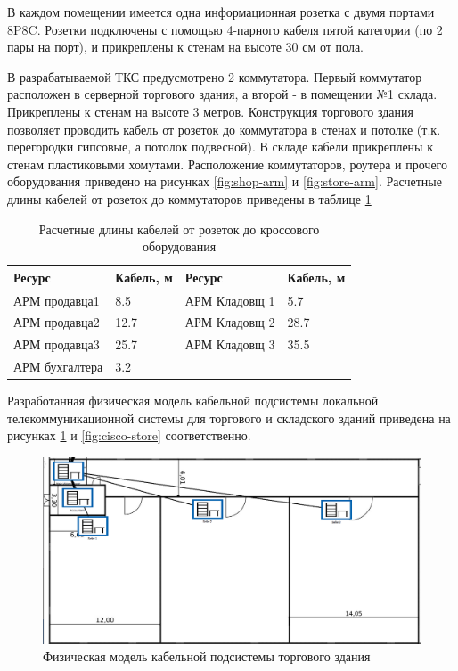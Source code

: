 В каждом помещении имеется одна информационная розетка с двумя портами 8P8C. Розетки подключены с помощью 4-парного кабеля пятой категории (по 2 пары на порт), и прикреплены к стенам на высоте 30 см от пола.

В разрабатываемой ТКС предусмотрено 2 коммутатора. Первый коммутатор расположен в серверной торгового здания, а второй \hyp{} в помещении №1 склада. Прикреплены к стенам на высоте 3 метров. Конструкция торгового здания позволяет проводить кабель от розеток до коммутатора в стенах и потолке (т.к. перегородки гипсовые, а потолок подвесной). В складе кабели прикреплены к стенам пластиковыми хомутами. Расположение коммутаторов, роутера и прочего оборудования приведено на рисунках \ref{fig:shop-arm} и \ref{fig:store-arm}. Расчетные длины кабелей от розеток до коммутаторов приведены в таблице \ref{tab:crosscablen}

\begin{table}[H]
  \centering
  \caption{Расчетные длины кабелей от розеток до кроссового оборудования}
  \begin{tabular}{|l|l||l|l|} \hline
    Ресурс & Кабель, м & Ресурс & Кабель, м \\ \hline
    АРМ продавца1 & 8.5 & АРМ Кладовщ 1 & 5.7\\ \hline
    АРМ продавца2 & 12.7 & АРМ Кладовщ 2 & 28.7\\ \hline
    АРМ продавца3 & 25.7 & АРМ Кладовщ 3 & 35.5\\ \hline
    АРМ бухгалтера & 3.2 & & \\ \hline
  \end{tabular}
  \label{tab:crosscablen}
\end{table}

Разработанная физическая модель кабельной подсистемы локальной телекоммуникационной системы для торгового и складского зданий приведена на рисунках \ref{fig:cisco-shop} и \ref{fig:cisco-store} соответственно.

\begin{figure}[H]
  \centering
  \includegraphics[width=\linewidth]{sec3/img/cisco-shop.png}
  \caption{Физическая модель кабельной подсистемы торгового здания}
  \label{fig:cisco-shop}
\end{figure}

